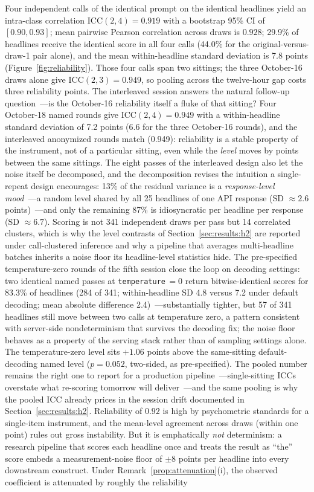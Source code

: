 Four independent calls of the identical prompt on the identical headlines yield an intra-class correlation $\text{ICC}(2,4)=0.919$ with a bootstrap 95\% CI of $[0.90, 0.93]$; mean pairwise Pearson correlation across draws is $0.928$; 29.9\% of headlines receive the identical score in all four calls (44.0\% for the original-versus-draw-1 pair alone), and the mean within-headline standard deviation is 7.8 points (Figure~\ref{fig:reliability}). Those four calls span two sittings; the three October-16 draws alone give $\text{ICC}(2,3)=0.949$, so pooling across the twelve-hour gap costs three reliability points. The interleaved session answers the natural follow-up question~---is the October-16 reliability itself a fluke of that sitting? Four October-18 named rounds give $\text{ICC}(2,4)=0.949$ with a within-headline standard deviation of 7.2 points (6.6 for the three October-16 rounds), and the interleaved anonymized rounds match (0.949): reliability is a stable property of the instrument, not of a particular sitting, even while the \emph{level} moves by points between the same sittings. The eight passes of the interleaved design also let the noise itself be decomposed, and the decomposition revises the intuition a single-repeat design encourages: 13\% of the residual variance is a \emph{response-level mood}~---a random level shared by all 25 headlines of one API response (SD $\approx2.6$ points)~---and only the remaining 87\% is idiosyncratic per headline per response (SD $\approx6.7$). Scoring is not 341 independent draws per pass but 14 correlated clusters, which is why the level contrasts of Section~\ref{sec:results:h2} are reported under call-clustered inference and why a pipeline that averages multi-headline batches inherits a noise floor its headline-level statistics hide. The pre-specified temperature-zero rounds of the fifth session close the loop on decoding settings: two identical named passes at \texttt{temperature}$\,=0$ return bitwise-identical scores for 83.3\% of headlines (284 of 341; within-headline SD 4.8 versus 7.2 under default decoding; mean absolute difference 2.4)~---substantially tighter, but 57 of 341 headlines still move between two calls at temperature zero, a pattern consistent with server-side nondeterminism that survives the decoding fix; the noise floor behaves as a property of the serving stack rather than of sampling settings alone. The temperature-zero level sits $+1.06$ points above the same-sitting default-decoding named level ($p=0.052$, two-sided, as pre-specified). The pooled number remains the right one to report for a production pipeline~---single-sitting ICCs overstate what re-scoring tomorrow will deliver~---and the same pooling is why the pooled ICC already prices in the session drift documented in Section~\ref{sec:results:h2}. Reliability of $0.92$ is high by psychometric standards for a single-item instrument, and the mean-level agreement across draws (within one point) rules out gross instability. But it is emphatically \emph{not} determinism: a research pipeline that scores each headline once and treats the result as ``the'' score embeds a measurement-noise floor of $\pm8$ points per headline into every downstream construct. Under Remark~\ref{prop:attenuation}(i), the observed coefficient is attenuated by roughly the reliability 